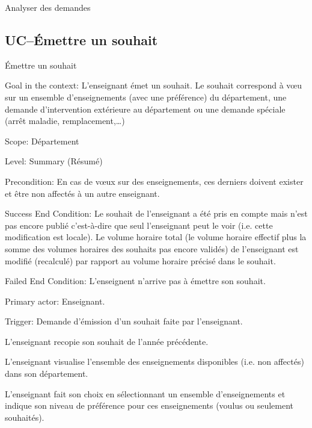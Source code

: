 \begin{ocl}
\begin{usecase}{Analyser des demandes}
\end{usecase}

\subsection{UC\---Émettre un souhait}

\begin{usecase}{\'Emettre un souhait}\label{usecase:souhait}
\begin{information}

\item [{Goal in the context:}]
 L'enseignant émet un souhait. Le souhait correspond à v\oe u sur un ensemble d'enseignements (avec une préférence) du département, une demande d'intervention extérieure au département ou une demande spéciale (arrêt maladie, remplacement,\dots)

\item[Scope:] Département

\item [{Level:}] Summary (Résumé)

\item[{Precondition:}]
 En cas de vœux sur des enseignements, ces derniers doivent exister et être non affectés à un autre enseignant.

\item[{Success End Condition:}]
 Le souhait de l'enseignant a été pris en compte mais n'est pas encore publié c'est-à-dire que seul l'enseignant peut le voir (i.e. cette modification est locale). 
Le volume horaire total (le volume horaire effectif plus la somme des volumes horaires des souhaits pas encore validés) de l'enseignant est modifié (recalculé) par rapport au volume horaire précisé dans le souhait.

\item[{Failed End Condition:}] L'enseignent n'arrive pas à émettre son souhait.
\item[{Primary actor:}] Enseignant.
\item[{Trigger:}] Demande d'émission d'un souhait faite par l'enseignant.
\end{information}

 \begin{scenario}
	 \item L'enseignant recopie son souhait de l'année précédente.
	 \item L'enseignant visualise l'ensemble des enseignements disponibles (i.e. non affectés) dans son département.
	 \item L'enseignant fait son choix en sélectionnant un ensemble d'enseignements et indique son niveau de préférence pour ces enseignements (voulus ou seulement souhaités).
 \end{scenario}



\end{usecase}
\end{ocl}
